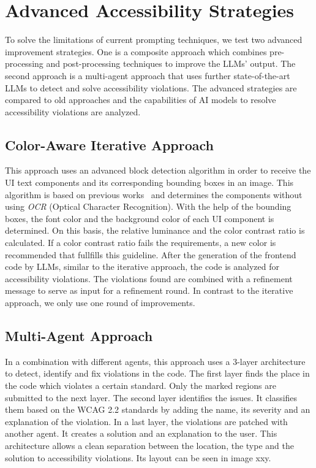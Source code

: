 \section{Advanced Accessibility Strategies}
To solve the limitations of current prompting techniques, we test two 
advanced improvement strategies. One is a composite approach which combines 
pre-processing and post-processing techniques to improve the LLMs' output.
The second approach is a multi-agent approach that uses further 
state-of-the-art LLMs to detect and solve accessibility violations. \newline
The advanced strategies are compared to old approaches and the capabilities 
of AI models to resolve accessibility violations are analyzed.

\subsection{Color-Aware Iterative Approach}
This approach uses an advanced block detection algorithm in order to receive
the UI text components and its corresponding bounding boxes in an image. This 
algorithm is based on previous works~\parencite{si2024design2code} and 
determines the components without using \textit{OCR} (Optical Character 
Recognition). With the help of the bounding boxes, the font color 
and the background color of each UI component is determined. On this basis,
the relative luminance and the color contrast ratio is calculated. If a 
color contrast ratio fails the requirements, a new color is recommended 
that fullfills this guideline.\newline
After the generation of the frontend code by LLMs, similar to the 
iterative approach, the code is analyzed for accessibility violations. The 
violations found are combined with a refinement message to serve as input 
for a refinement round. In contrast to the iterative approach, we only use 
one round of improvements.

\subsection{Multi-Agent Approach}
In a combination with different agents, this approach uses a 3-layer architecture
to detect, identify and fix violations in the code. \newline
The first layer finds the place in the code which violates a certain standard.
Only the marked regions are submitted to the next layer. The second layer 
identifies the issues. It classifies them based on the WCAG 2.2 standards by 
adding the name, its severity and an explanation of the violation. In a last 
layer, the violations are patched with another agent. It creates a solution 
and an explanation to the user.\newline
This architecture allows a clean separation between the location, the type and 
the solution to accessibility violations. Its layout can be seen in image xxy.
